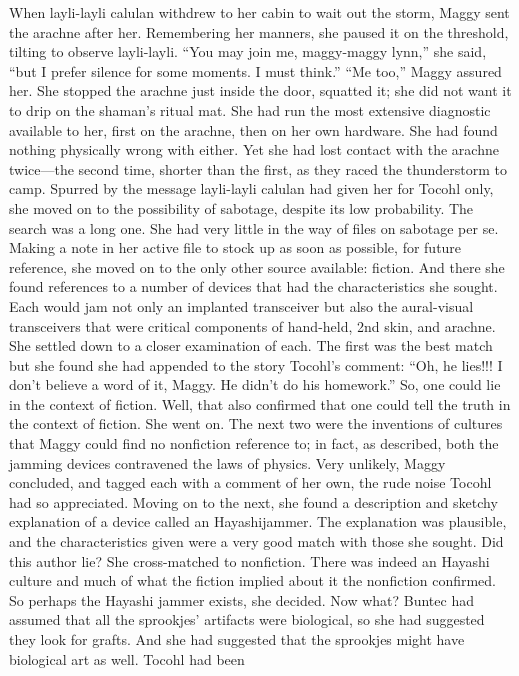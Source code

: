 \documentclass[9pt]{article}
\begin{document}
When layli-layli calulan withdrew to her cabin to wait out the storm, Maggy sent the arachne after
her. Remembering her manners, she paused it on the threshold, tilting to observe layli-layli. “You may
join me, maggy-maggy lynn,” she said, “but I prefer silence for some moments. I must think.”
“Me too,” Maggy assured her. She stopped the arachne just inside the door, squatted it; she did not
want it to drip on the shaman’s ritual mat.
She had run the most extensive diagnostic available to her, first on the arachne, then on her own
hardware. She had found nothing physically wrong with either. Yet she had lost contact with the arachne
twice—the second time, shorter than the first, as they raced the thunderstorm to camp.
Spurred by the message layli-layli calulan had given her for Tocohl only, she moved on to the
possibility of sabotage, despite its low probability.
The search was a long one. She had very little in the way of files on sabotage per se. Making a note
in her active file to stock up as soon as possible, for future reference, she moved on to the only other
source available: fiction.
And there she found references to a number of devices that had the characteristics she sought. Each
would jam not only an implanted transceiver but also the aural-visual transceivers that were critical
components of hand-held, 2nd skin, and arachne.
She settled down to a closer examination of each. The first was the best match but she found she had
appended to the story Tocohl’s comment: “Oh, he lies!!! I don’t believe a word of it, Maggy. He didn’t
do his homework.” So, one could lie in the context of fiction. Well, that also confirmed that one could tell
the truth in the context of fiction. She went on.
The next two were the inventions of cultures that Maggy could find no nonfiction reference to; in fact,
as described, both the jamming devices contravened the laws of physics. Very unlikely, Maggy
concluded, and tagged each with a comment of her own, the rude noise Tocohl had so appreciated.
Moving on to the next, she found a description and sketchy explanation of a device called an Hayashijammer. The explanation was plausible, and the characteristics given were a very good match with those
she sought. Did this author lie?
She cross-matched to nonfiction. There was indeed an Hayashi culture and much of what the fiction
implied about it the nonfiction confirmed. So perhaps the Hayashi jammer exists, she decided. Now
what?
Buntec had assumed that all the sprookjes’ artifacts were biological, so she had suggested they look
for grafts. And she had suggested that the sprookjes might have biological art as well. Tocohl had been
\end{document}
